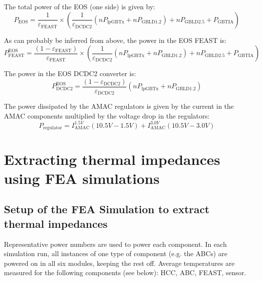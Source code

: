 The total power of the EOS (one side) is given by:
\begin{equation}
P_\text{EOS} = \frac{1}{\varepsilon_\text{FEAST}}\times
  \left( \frac{1}{\varepsilon_\text{DCDC2}} (n P_\text{lpGBTx} + n P_\text{GBLD1.2}) + n P_\text{GBLD2.5} + P_\text{GBTIA} \right)
\end{equation}

As can probably be inferred from above, the power in the EOS FEAST is:
\begin{equation}
P^\text{EOS}_\text{FEAST} = \frac{(1-\varepsilon_\text{FEAST})}{\varepsilon_\text{FEAST}}\times
  \left( \frac{1}{\varepsilon_\text{DCDC2}} (n P_\text{lpGBTx} + n P_\text{GBLD1.2}) + n P_\text{GBLD2.5} + P_\text{GBTIA} \right)
\end{equation}

The power in the EOS DCDC2 converter is:
\begin{equation}
P^\text{EOS}_\text{DCDC2} = \frac{(1-\varepsilon_\text{DCDC2})}{\varepsilon_\text{DCDC2}} \left(n P_\text{lpGBTx} + n P_\text{GBLD1.2}\right)
\end{equation}


The power dissipated by the AMAC regulators is given by the current in the AMAC components multiplied
by the voltage drop in the regulators:
\begin{equation}
P_\text{regulator} = I^{1.5V}_\text{AMAC}\left(  10.5V - 1.5V \right)
                   + I^{3.0V}_\text{AMAC}\left(  10.5V - 3.0V \right)
\label{eq:amac_regulator}
\end{equation}



\section{ Extracting thermal impedances using FEA simulations}

\subsection{Setup of the FEA Simulation to extract thermal impedances}

Representative power numbers are used to power each component. In each simulation run, all instances
of one type of component (e.g. the ABCs) are powered on in all six modules, keeping the rest off.
Average temperatures are measured for the following components (see below): HCC, ABC, FEAST, sensor.

